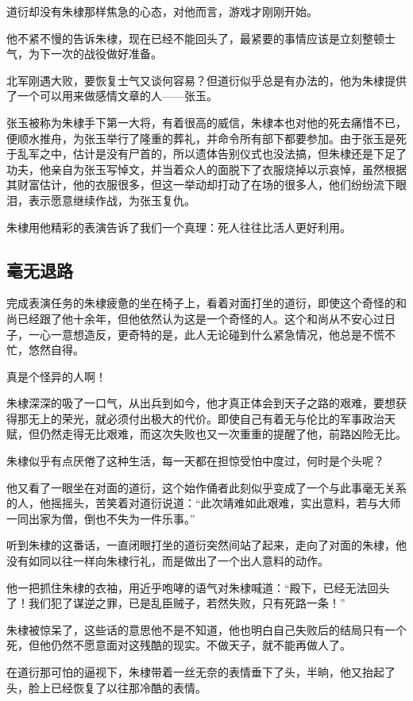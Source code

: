 \begin{multicols}{\theparacolNo}
		道衍却没有朱棣那样焦急的心态，对他而言，游戏才刚刚开始。

		他不紧不慢的告诉朱棣，现在已经不能回头了，最紧要的事情应该是立刻整顿士气，为下一次的战役做好准备。

		北军刚遇大败，要恢复士气又谈何容易？但道衍似乎总是有办法的，他为朱棣提供了一个可以用来做感情文章的人——张玉。

		张玉被称为朱棣手下第一大将，有着很高的威信，朱棣本也对他的死去痛惜不已，便顺水推舟，为张玉举行了隆重的葬礼，并命令所有部下都要参加。由于张玉是死于乱军之中，估计是没有尸首的，所以遗体告别仪式也没法搞，但朱棣还是下足了功夫，他亲自为张玉写悼文，并当着众人的面脱下了衣服烧掉以示哀悼，虽然根据其财富估计，他的衣服很多，但这一举动却打动了在场的很多人，他们纷纷流下眼泪，表示愿意继续作战，为张玉复仇。

		朱棣用他精彩的表演告诉了我们一个真理：死人往往比活人更好利用。

		\subsection{毫无退路}
		完成表演任务的朱棣疲惫的坐在椅子上，看着对面打坐的道衍，即使这个奇怪的和尚已经跟了他十余年，但他依然认为这是一个奇怪的人。这个和尚从不安心过日子，一心一意想造反，更奇特的是，此人无论碰到什么紧急情况，他总是不慌不忙，悠然自得。

		真是个怪异的人啊！

		朱棣深深的吸了一口气，从出兵到如今，他才真正体会到天子之路的艰难，要想获得那无上的荣光，就必须付出极大的代价。即使自己有着无与伦比的军事政治天赋，但仍然走得无比艰难，而这次失败也又一次重重的提醒了他，前路凶险无比。

		朱棣似乎有点厌倦了这种生活，每一天都在担惊受怕中度过，何时是个头呢？

		他又看了一眼坐在对面的道衍，这个始作俑者此刻似乎变成了一个与此事毫无关系的人，他摇摇头，苦笑着对道衍说道：“此次靖难如此艰难，实出意料，若与大师一同出家为僧，倒也不失为一件乐事。”

		听到朱棣的这番话，一直闭眼打坐的道衍突然间站了起来，走向了对面的朱棣，他没有如同以往一样向朱棣行礼，而是做出了一个出人意料的动作。

		他一把抓住朱棣的衣袖，用近乎咆哮的语气对朱棣喊道：“殿下，已经无法回头了！我们犯了谋逆之罪，已是乱臣贼子，若然失败，只有死路一条！”

		朱棣被惊呆了，这些话的意思他不是不知道，他也明白自己失败后的结局只有一个死，但他仍然不愿意面对这残酷的现实。不做天子，就不能再做人了。

		在道衍那可怕的逼视下，朱棣带着一丝无奈的表情垂下了头，半晌，他又抬起了头，脸上已经恢复了以往那冷酷的表情。


\end{multicols}
